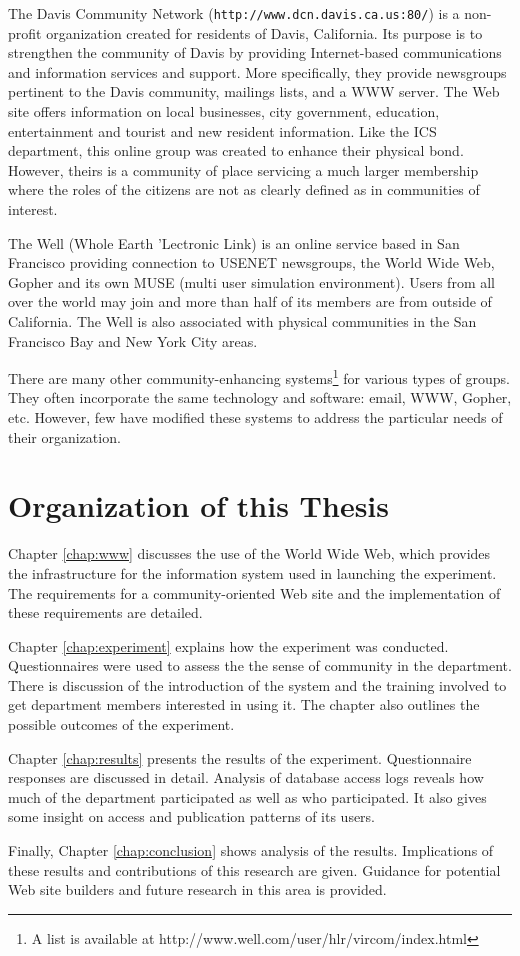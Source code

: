The Davis Community Network ({\tt http://www.dcn.davis.ca.us:80/}) is a
non-profit organization created for residents of Davis, California.  Its
purpose is to strengthen the community of Davis by providing Internet-based
communications and information services and support.  More specifically, they
provide newsgroups pertinent to the Davis community, mailings lists, and a WWW
server.  The Web site offers information on local businesses, city government,
education, entertainment and tourist and new resident information.  Like the
ICS department, this online group was created to enhance their physical bond.
However, theirs is a community of place servicing a much larger membership
where the roles of the citizens are not as clearly defined as in communities of
interest.

The Well (Whole Earth 'Lectronic Link) is an online service based in San
Francisco providing connection to USENET newsgroups, the World Wide Web, Gopher
and its own MUSE (multi user simulation environment).  Users from all over the
world may join and more than half of its members are from outside of
California.  The Well is also associated with physical communities in the San
Francisco Bay and New York City areas. 

There are many other community-enhancing systems\footnote{A list is available
at http://www.well.com/user/hlr/vircom/index.html} for various types of groups.
They often incorporate the same technology and software: email, WWW, Gopher,
etc.  However, few have modified these systems to address the particular needs
of their organization.

\section{Organization of this Thesis}
Chapter \ref{chap:www} discusses the use of the World Wide Web, which provides
the infrastructure for the information system used in launching the experiment.
The requirements for a community-oriented Web site and the implementation of
these requirements are detailed.

Chapter \ref{chap:experiment} explains how the experiment was conducted.
Questionnaires were used to assess the the sense of community in the
department.  There is discussion of the introduction of the system and the
training involved to get department members interested in using it.  The
chapter also outlines the possible outcomes of the experiment.

Chapter \ref{chap:results} presents the results of the experiment.
Questionnaire responses are discussed in detail.  Analysis of database access
logs reveals how much of the department participated as well as who
participated.  It also gives some insight on access and publication patterns of
its users.

Finally, Chapter \ref{chap:conclusion} shows analysis of the results.
Implications of these results and contributions of this research are given.
Guidance for potential Web site builders and future research in this area is
provided.


